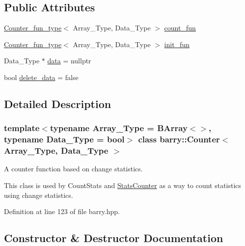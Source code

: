 \subsection*{Public Attributes}
\begin{DoxyCompactItemize}
\item 
\hyperlink{namespacebarry_abaaae3200da8e4b7faac3c04fe9c3081}{Counter\+\_\+fun\+\_\+type}$<$ Array\+\_\+\+Type, Data\+\_\+\+Type $>$ \hyperlink{classbarry_1_1_counter_aa535e164838a3a9c780e8d15fe45679b}{count\+\_\+fun}
\item 
\hyperlink{namespacebarry_abaaae3200da8e4b7faac3c04fe9c3081}{Counter\+\_\+fun\+\_\+type}$<$ Array\+\_\+\+Type, Data\+\_\+\+Type $>$ \hyperlink{classbarry_1_1_counter_a2509d75d3fc9e33d708911a38373d8ab}{init\+\_\+fun}
\item 
Data\+\_\+\+Type $\ast$ \hyperlink{classbarry_1_1_counter_af8196eeaaa4b58b788969c07aee7f1ee}{data} = nullptr
\item 
bool \hyperlink{classbarry_1_1_counter_a5445fa47abeff4b5675a5e5c12e4917a}{delete\+\_\+data} = false
\end{DoxyCompactItemize}


\subsection{Detailed Description}
\subsubsection*{template$<$typename Array\+\_\+\+Type = B\+Array$<$$>$, typename Data\+\_\+\+Type = bool$>$\newline
class barry\+::\+Counter$<$ Array\+\_\+\+Type, Data\+\_\+\+Type $>$}

A counter function based on change statistics. 

This class is used by {\ttfamily Count\+Stats} and {\ttfamily \hyperlink{classbarry_1_1_stats_counter}{Stats\+Counter}} as a way to count statistics using change statistics. 

Definition at line 123 of file barry.\+hpp.



\subsection{Constructor \& Destructor Documentation}
\mbox{\label{classbarry_1_1_counter_a3c990d6dbcdc553b3179c8353497a7df}} 
